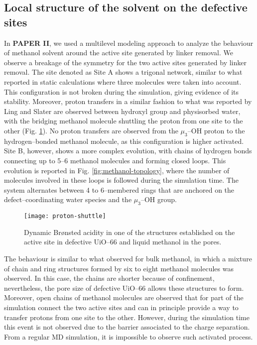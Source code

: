 \subsection*{Local structure of the solvent on the defective sites}
In \textbf{PAPER II}, we used a multilevel modeling approach to analyze the behaviour of methanol solvent around the active site generated by linker removal. We observe a breakage of the symmetry for the two active sites generated by linker removal. The site denoted as Site A shows a trigonal network, similar to what reported in static calculations where three molecules were taken into account. This configuration is not broken during the simulation, giving evidence of its stability. Moreover, proton transfers in a similar fashion to what was reported by Ling and Slater \cite{ling2016dynamic} are observed between hydroxyl group and physisorbed water, with the bridging methanol molecule shuttling the proton from one site to the other (Fig. \ref{fig:proton-shuttle}). No proton transfers are observed from the $\mu_3$--OH proton to the hydrogen--bonded methanol molecule, as this configuration is higher activated. Site B, however, shows a more complex evolution, with chains of hydrogen bonds connecting up to 5--6 methanol molecules and forming closed loops. This evolution is reported in Fig. \ref{fig:methanol-topology}, where the number of molecules involved in these loops is followed during the simulation time. The system alternates between 4 to 6--membered rings that are anchored on the defect--coordinating water species and the $\mu_3$--OH group. 
\begin{figure}[!htbp]
	\centering
	\texttt{[image: proton-shuttle]}
	\caption{Dynamic Br\o{}nsted acidity in one of the structures established on the active site in defective UiO--66 and liquid methanol in the pores.}
	\label{fig:proton-shuttle}
\end{figure}
\npar
The behaviour is similar to what observed for bulk methanol\cite{kashtanov2005chemical, pagliai2003hydrogen, morrone2002ab}, in which a mixture of chain and ring structures formed by six to eight methanol molecules was observed. In this case, the chains are shorter because of confinement, nevertheless, the pore size of defective UiO--66 allows these structures to form. Moreover, open chains of methanol molecules are observed that for part of the simulation connect the two active sites and can in principle provide a way to transfer protons from one site to the other. However, during the simulation time this event is not observed due to the barrier associated to the charge separation. From a regular MD simulation, it is impossible to observe such activated process. 
